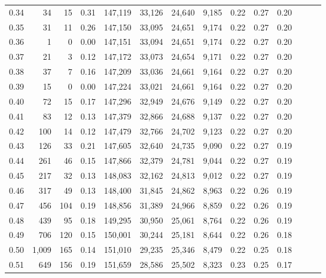 \begin{tabular}{rrrrrrrrrrrrrr}
0.34 &      34 &     15 &  0.31 &  147,119 &   33,126 &  24,640 &   9,185 &  0.22 &  0.27 &      0.20 \\
0.35 &      31 &     11 &  0.26 &  147,150 &   33,095 &  24,651 &   9,174 &  0.22 &  0.27 &      0.20 \\
0.36 &       1 &      0 &  0.00 &  147,151 &   33,094 &  24,651 &   9,174 &  0.22 &  0.27 &      0.20 \\
0.37 &      21 &      3 &  0.12 &  147,172 &   33,073 &  24,654 &   9,171 &  0.22 &  0.27 &      0.20 \\
0.38 &      37 &      7 &  0.16 &  147,209 &   33,036 &  24,661 &   9,164 &  0.22 &  0.27 &      0.20 \\
0.39 &      15 &      0 &  0.00 &  147,224 &   33,021 &  24,661 &   9,164 &  0.22 &  0.27 &      0.20 \\
0.40 &      72 &     15 &  0.17 &  147,296 &   32,949 &  24,676 &   9,149 &  0.22 &  0.27 &      0.20 \\
0.41 &      83 &     12 &  0.13 &  147,379 &   32,866 &  24,688 &   9,137 &  0.22 &  0.27 &      0.20 \\
0.42 &     100 &     14 &  0.12 &  147,479 &   32,766 &  24,702 &   9,123 &  0.22 &  0.27 &      0.20 \\
0.43 &     126 &     33 &  0.21 &  147,605 &   32,640 &  24,735 &   9,090 &  0.22 &  0.27 &      0.19 \\
0.44 &     261 &     46 &  0.15 &  147,866 &   32,379 &  24,781 &   9,044 &  0.22 &  0.27 &      0.19 \\
0.45 &     217 &     32 &  0.13 &  148,083 &   32,162 &  24,813 &   9,012 &  0.22 &  0.27 &      0.19 \\
0.46 &     317 &     49 &  0.13 &  148,400 &   31,845 &  24,862 &   8,963 &  0.22 &  0.26 &      0.19 \\
0.47 &     456 &    104 &  0.19 &  148,856 &   31,389 &  24,966 &   8,859 &  0.22 &  0.26 &      0.19 \\
0.48 &     439 &     95 &  0.18 &  149,295 &   30,950 &  25,061 &   8,764 &  0.22 &  0.26 &      0.19 \\
0.49 &     706 &    120 &  0.15 &  150,001 &   30,244 &  25,181 &   8,644 &  0.22 &  0.26 &      0.18 \\
0.50 &   1,009 &    165 &  0.14 &  151,010 &   29,235 &  25,346 &   8,479 &  0.22 &  0.25 &      0.18 \\
0.51 &     649 &    156 &  0.19 &  151,659 &   28,586 &  25,502 &   8,323 &  0.23 &  0.25 &      0.17 \\

\end{tabular}
